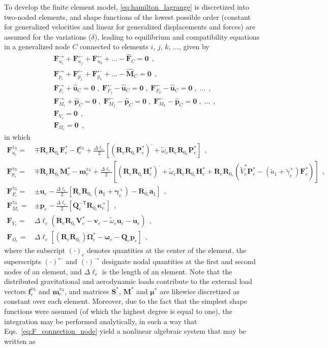 \documentclass[journal]{new-aiaa}
\newcommand{\vect}[1]{\bm{#1}}
\newcommand{\uvec}[1]{\bm{#1}}
\def\tens#1{\bm{#1}}
\def\til#1{\widetilde{#1}}
\def\lb{\left[}
\def\rb{\right]}
\def\lp{\left(}
\def\rp{\right)}
\def\T{\mathsf{T}}
\def\aone{\uvec{a}_1}
\def\aonetil{\til{a}_1}
\def\dotout{^{\boldsymbol{\cdot}}}
\def\R{\tens{R}}
\def\u{\vect{u}}
\def\udot{\dot{\u}}
\def\uhat{\widehat{\u}}
\def\gam{\vect{\gamma}}
\def\gamp{\gam^{+}}
\def\kap{\vect{\kappa}}
\def\kapp{\kap^{+}}
\def\V{\vect{V}}
\def\Vs{\V^{*}}
\def\Om{\vect{\Omega}}
\def\Oms{\Om^{*}}
\def\P{\vect{P}}
\def\Ps{\P^*}
\def\Hv{\vect{H}}
\def\Hvs{\Hv^*}
\def\Q{\tens{Q}}
\def\p{\vect{p}}
\def\pdot{\dot{\p}}
\def\phat{\widehat{\p}}
\def\F{\vect{F}}
\def\Fhat{\widehat{\F}}
\def\Fs{\F^*}
\def\M{\vect{M}}
\def\Mhat{\widehat{\M}}
\def\Ms{\M^*}
\def\f{\vect{f}}
\def\m{\vect{m}}
\def\zv{\vect{0}}
\def\Deltal{\Delta \ell_e}
\def\dlotwo{\frac{\Deltal}{2}}
\def\vbe{\vect{v}_{e}}
\def\ombe{\vect{\omega}_{e}}
\def\omtilbe{\til{\omega}_{e}}
\def\ue{\u_e}
\def\udote{\udot_e}
\def\pe{\p_e}
\def\pdote{\pdot_e}
\def\Vse{\Vs_e}
\def\Vtilse{\til{V}^*_{e}}
\def\Omse{\Oms_e}
\def\gampe{\gamp_e}
\def\kappe{\kapp_e}
\def\gamptile{\til{\gamma}^{+}_e}
\def\Fse{\Fs_e}
\def\Mse{\Ms_e}
\def\Pse{\Ps_e}
\def\Hse{\Hvs_e}
\def\Qe{\Q_e}
\def\HinvTe{\Q^{-\T}_e}
\def\fe{\f_e}
\def\me{\m_e}
\def\Re{\R_{e}}
\def\Rze{\R_{0_e}}
\def\Stiff{\mathcal{\tens{S}}^*}
\def\Mass{\mathcal{\tens{M}}^*}
\def\Damp{\mathcal{\tens{\mu}}^*}
\def\Fu{\mathtt{\vect{F}}_{u_e}}
\def\Fupi{\mathtt{\vect{F}}_{u_i}^\rightarrow}
\def\Fumj{\mathtt{\vect{F}}_{u_j}^\leftarrow}
\def\Fumk{\mathtt{\vect{F}}_{u_k}^\leftarrow}
\def\Fump{\Fu^{\leftrightarrows}}
\def\Fp{\mathtt{\vect{F}}_{p_e}}
\def\Fppi{\mathtt{\vect{F}}_{p_i}^\rightarrow}
\def\Fpmj{\mathtt{\vect{F}}_{p_j}^\leftarrow}
\def\Fpmk{\mathtt{\vect{F}}_{p_k}^\leftarrow}
\def\Fpmp{\Fp^{\leftrightarrows}}
\def\FF{\mathtt{\vect{F}}_{F_e}}
\def\FFpi{\mathtt{\vect{F}}_{F_i}^\rightarrow}
\def\FFmj{\mathtt{\vect{F}}_{F_j}^\leftarrow}
\def\FFmk{\mathtt{\vect{F}}_{F_k}^\leftarrow}
\def\FFmp{\FF^{\leftrightarrows}}
\def\FM{\mathtt{\vect{F}}_{M_e}}
\def\FMpi{\mathtt{\vect{F}}_{M_i}^\rightarrow}
\def\FMmj{\mathtt{\vect{F}}_{M_j}^\leftarrow}
\def\FMmk{\mathtt{\vect{F}}_{M_k}^\leftarrow}
\def\FMmp{\FM^{\leftrightarrows}}
\def\FV{\mathtt{\vect{F}}_{V_e}}
\def\FO{\mathtt{\vect{F}}_{\Omega_e}}
\begin{document}
To develop the finite element model, \cref{eq:hamilton_lagrange} is discretized into two-noded elements, and shape functions of the lowest possible order (constant for generalized velocities and linear for generalized displacements and forces) are assumed for the variations ($\delta$), leading to equilibrium and compatibility equations in a generalized node $C$ connected to elements $i$, $j$, $k$, $\ldots$, given by
\begin{equation}
    \begin{aligned}
        &\Fupi + \Fumj + \Fumk + \ldots - \Fhat_C = \zv \ \ ,
        \\
        &\Fppi + \Fpmj + \Fpmk + \ldots - \Mhat_C = \zv \ \ ,
        \\
        &\FFpi + \uhat_C = \zv \;,\; \FFmj - \uhat_C = \zv \;,\; \FFmk - \uhat_C = \zv \;,\; \ldots \ \ ,
        \\
        &\FMpi + \phat_C = \zv \;,\; \FMmj - \phat_C = \zv \;,\; \FMmk - \phat_C = \zv \;,\; \ldots \ \ ,
        \\
        &\FV = \zv \ \ ,
        \\
        &\FO = \zv \ \ ,
        \label{eq:F_connection_node}
    \end{aligned}
\end{equation}
in which
\begin{align}
    \Fump =& \mp\Re\Rze\Fse - \fe^\leftrightarrows + \dlotwo\lb\lp\Re\Rze\Pse\rp\dotout+\omtilbe\Re\Rze\Pse\rb \ \ ,
    \label{eq_Fu} \\
    \Fpmp =& \mp\Re\Rze\Mse - \me^\leftrightarrows + \dlotwo \lb \lp\Re\Rze\Hse\rp\dotout+\omtilbe\Re\Rze\Hse + \Re\Rze\lp\Vtilse\Pse-\lp\aonetil+\gamptile\rp\Fse\rp \rb \ \ ,
    \label{eq_Fp} \\
    \FFmp =& \pm\ue - \dlotwo\lb\Re\Rze\lp\aone+\gampe\rp-\Rze\aone\rb \ \ , 
    \label{eq_FF} \\
    \FMmp =& \pm\pe - \dlotwo\lb\HinvTe\Rze\kappe\rb \ \ ,
    \label{eq_FM} \\
    \FV =& \Deltal\lp\Re\Rze\Vse-\vbe-\omtilbe\ue-\udote\rp \ \ , 
    \label{eq_FV} \\
    \FO =& \Deltal\lb\lp\Re\Rze\rp\Omse-\ombe-\Qe\pdote\rb \ \ ,
    \label{eq_FO}
\end{align}
where the subscript $\lp\cdot\rp_{e}$ denotes quantities at the center of the element, the superscripts $\lp\cdot\rp^\leftarrow$ and $\lp\cdot\rp^\rightarrow$ designate nodal quantities at the first and second nodes of an element, and $\Deltal$ is the length of an element. Note that the distributed gravitational and aerodynamic loads contribute to the external load vectors $\fe^\leftrightarrows$ and $\me^\leftrightarrows$, and matrices $\Stiff$, $\Mass$ and $\Damp$ are likewise discretized as constant over each element. Moreover, due to the fact that the simplest shape functions were assumed (of which the highest degree is equal to one), the integration may be performed analytically, in such a way that Eqs.~\eqref{eq:F_connection_node} yield a nonlinear algebraic system that may be written as
\end{document}
